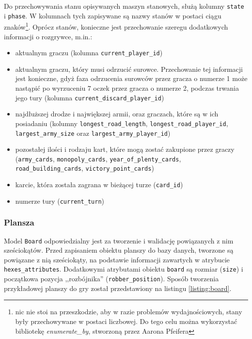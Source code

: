 \documentclass[a4paper,12pt]{article}
\begin{document}
Do przechowywania stanu opisywanych maszyn stanowych, służą kolumny
\texttt{state} i \texttt{phase}. W kolumnach tych zapisywane są nazwy
stanów w postaci ciągu znaków\footnote{nic nie stoi na przeszkodzie,
  aby w razie problemów wydajnościowych, stany były przechowywane w
  postaci liczbowej. Do tego celu można wykorzystać bibliotekę
  \emph{enumerate\_by}, stworzoną przez Aarona Pfeifera}. Oprócz
stanów, konieczne jest przechowanie szeregu dodatkowych informacji o
rozgrywce, m.in.:

\begin{itemize}
\item aktualnym graczu (kolumna \texttt{current\_player\_id})
\item aktualnym graczu, który musi odrzucić surowce. Przechowanie tej
  informacji jest konieczne, gdyż faza odrzucenia surowców przez
  gracza o numerze 1 może nastąpić po wyrzuceniu 7 oczek przez gracza
  o numerze 2, podczas trwania jego tury (kolumna
  \texttt{current\_discard\_player\_id})
\item najdłuższej drodze i największej armii, oraz graczach, które są
  w ich posiadaniu (kolumny \texttt{longest\_road\_length},
  \texttt{longest\_road\_player\_id}, \texttt{largest\_army\_size}
  oraz \texttt{largest\_army\_player\_id})
\item pozostałej ilości i rodzaju kart, które mogą zostać zakupione
  przez graczy (\texttt{army\_cards}, \texttt{monopoly\_cards},
  \texttt{year\_of\_plenty\_cards}, \texttt{road\_building\_cards},
  \texttt{victory\_point\_cards})
\item karcie, która została zagrana w bieżącej turze (\texttt{card\_id})
\item numerze tury (\texttt{current\_turn})
\end{itemize}

\subsubsection{Plansza}

Model \texttt{Board} odpowiedzialny jest za tworzenie i walidację
powiązanych z nim sześciokątów. Przed zapisaniem obiektu planszy do
bazy danych, tworzone są powiązane z nią sześciokąty, na podstawie
informacji zawartych w atrybucie
\texttt{hexes\_attributes}. Dodatkowymi atrybutami obiektu
\texttt{board} są rozmiar (\texttt{size}) i początkowa pozycja
,,rozbójnika'' (\texttt{robber\_position}). Sposób tworzenia
przykładowej planszy do gry został przedstawiony na listingu
\ref{listing:board}.
\end{document}

